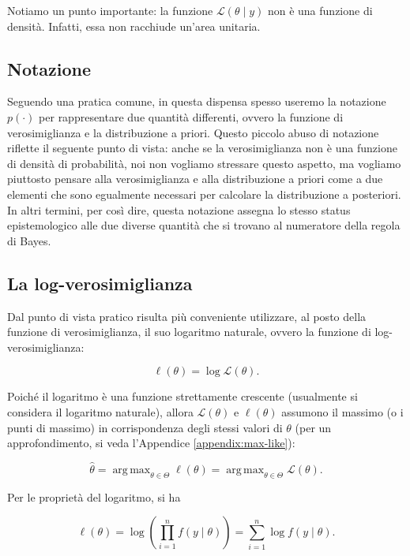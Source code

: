\documentclass[
  11pt,
]{krantz}
\DeclareMathOperator{\argmax}{arg\,max}
\theoremstyle{definition}
\theoremstyle{definition}
\theoremstyle{definition}
\theoremstyle{definition}
\theoremstyle{remark}
\begin{document}
Notiamo un punto importante: la funzione \(\mathcal{L}(\theta \mid y)\) non è una funzione di densità. Infatti, essa non racchiude un'area unitaria.

\hypertarget{notazione-1}{%
\subsection{Notazione}\label{notazione-1}}

Seguendo una pratica comune, in questa dispensa spesso useremo la notazione \(p(\cdot)\) per rappresentare due quantità differenti, ovvero la funzione di verosimiglianza e la distribuzione a priori. Questo piccolo abuso di notazione riflette il seguente punto di vista: anche se la verosimiglianza non è una funzione di densità di probabilità, noi non vogliamo stressare questo aspetto, ma vogliamo piuttosto pensare alla verosimiglianza e alla distribuzione a priori come a due elementi che sono egualmente necessari per calcolare la distribuzione a posteriori. In altri termini, per così dire, questa notazione assegna lo stesso status epistemologico alle due diverse quantità che si trovano al numeratore della regola di Bayes.

\hypertarget{la-log-verosimiglianza}{%
\subsection{La log-verosimiglianza}\label{la-log-verosimiglianza}}

Dal punto di vista pratico risulta più conveniente utilizzare, al posto della funzione di verosimiglianza, il suo logaritmo naturale, ovvero la funzione di log-verosimiglianza:

\begin{equation}
\ell(\theta) = \log \mathcal{L}(\theta).
\end{equation}

Poiché il logaritmo è una funzione strettamente crescente (usualmente si considera il logaritmo naturale), allora \(\mathcal{L}(\theta)\) e \(\ell(\theta)\) assumono il massimo (o i punti di massimo) in corrispondenza degli stessi valori di \(\theta\) (per un approfondimento, si veda l'Appendice \ref{appendix:max-like}):

\[
\hat{\theta} = \argmax_{\theta \in \Theta} \ell(\theta) = \argmax_{\theta \in \Theta} \mathcal{L}(\theta).
\]

Per le proprietà del logaritmo, si ha

\begin{equation}
\ell(\theta) = \log \left( \prod_{i = 1}^n f(y \mid \theta) \right) = \sum_{i = 1}^n \log f(y \mid \theta).
\end{equation}
\end{document}
